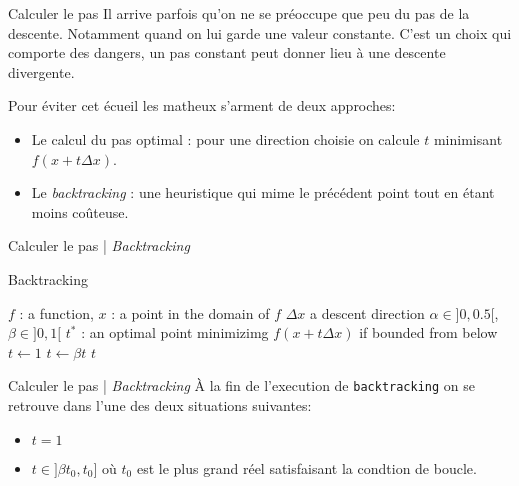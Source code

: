 \documentclass[aspectratio = 169]{beamer}
\begin{document}
\begin{frame}{Calculer le pas}
  Il arrive parfois qu'on ne se préoccupe que peu du pas de la
  descente. Notamment quand on lui garde une valeur constante. C'est
  un choix qui comporte des dangers, un pas constant peut donner lieu
  à une descente divergente. \pause

  Pour éviter cet écueil les matheux s'arment de deux approches:
  \begin{itemize}
  \item<3-> Le calcul du pas optimal : pour une direction choisie on
    calcule $t$ minimisant $f(x + t\Delta x)$.
  \item<4-> Le \emph{backtracking} : une heuristique qui mime le
    précédent point tout en étant moins coûteuse.
  \end{itemize}
\end{frame}

\begin{frame}{Calculer le pas | \emph{Backtracking}}
    \begin{algorithm}[H]
    \caption{Backtracking}
    \small{
      \begin{algorithmic}[1]
        \Statex
        \Require $f$ : a function,  $x$ : a point in the domain of $f$
        \Require $\Delta x$ a descent direction
        \Require $\alpha \in ]0, 0.5[$, $\beta \in ]0, 1[$
        \Ensure $t^*$ : an optimal point minimizimg $f(x + t\Delta x)$ if bounded from below
        \Statex
        \State $t \leftarrow 1$
        \State $t \leftarrow \beta t$
        \EndWhile
        \State \Return $t$
        \EndFunction
        \Statex
      \end{algorithmic}
    }
  \end{algorithm}
\end{frame}

\begin{frame}{Calculer le pas | \emph{Backtracking}}
  À la fin de l'execution de \texttt{backtracking} on se retrouve dans
  l'une des deux situations suivantes:
  \begin{itemize}
  \item<2-> $t = 1$
  \item<3-> $t \in ]\beta t_0, t_0]$ où $t_0$ est le plus grand réel
    satisfaisant la condtion de boucle.
  \end{itemize}
\end{frame}
\end{document}
